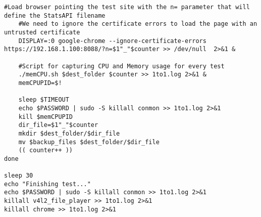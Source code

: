\begin{lstlisting}[caption=Script for P2P testing with 15 iterations]
 	#Load browser pointing the test site with the n= parameter that will define the StatsAPI filename
 	#We need to ignore the certificate errors to load the page with an untrusted certificate
 	DISPLAY=:0 google-chrome --ignore-certificate-errors https://192.168.1.100:8088/?n=$1"_"$counter >> /dev/null  2>&1 &

 	#Script for capturing CPU and Memory usage for every test
 	./memCPU.sh $dest_folder $counter >> 1to1.log 2>&1 &
 	memCPUPID=$!

 	sleep $TIMEOUT
 	echo $PASSWORD | sudo -S killall conmon >> 1to1.log 2>&1
 	kill $memCPUPID
 	dir_file=$1"_"$counter
 	mkdir $dest_folder/$dir_file
 	mv $backup_files $dest_folder/$dir_file
 	(( counter++ ))
done

sleep 30
echo "Finishing test..."
echo $PASSWORD | sudo -S killall conmon >> 1to1.log 2>&1
killall v4l2_file_player >> 1to1.log 2>&1
killall chrome >> 1to1.log 2>&1
\end{lstlisting}
